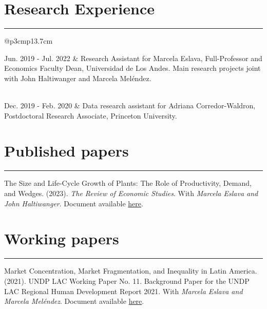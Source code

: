 \documentclass[12pt, letterpaper]{article}
\begin{document}
\section*{Research Experience}
\vspace*{-8mm}
\noindent \rule{\linewidth}{0.2mm}
\noindent
\begin{tabular}{@{}p{3cm}p{13.7cm}}
\raggedright{Jun. 2019 - Jul. 2022} &  Research Assistant for Marcela Eslava, Full-Professor and Economics Faculty Dean, Universidad de Los Andes. Main research projects joint with John Haltiwanger and Marcela Meléndez.  \\ 
\\ [-3mm]
\raggedright{Dec. 2019 - \newline Feb. 2020} & Data research assistant for Adriana Corredor-Waldron, Postdoctoral Research Associate, Princeton University.
\end{tabular}

\vspace*{-2mm}

\section*{Published papers}
\vspace*{-8mm}
\noindent \rule{\linewidth}{0.2mm}
\noindent The Size and Life-Cycle Growth of Plants: The Role of Productivity, Demand, and Wedges. (2023). \textit{The Review of Economic Studies}.   With \textit{Marcela Eslava and John Haltiwanger}. Document available \href{https://academic.oup.com/restud/advance-article/doi/10.1093/restud/rdad029/7054272?login=true}{here}. 

\vspace*{-5mm}

\section*{Working papers}
\vspace*{-8mm}
\noindent \rule{\linewidth}{0.2mm}

\noindent Market Concentration, Market Fragmentation, and Inequality in Latin America. (2021). UNDP LAC Working Paper No. 11. Background Paper for the UNDP LAC Regional Human Development Report 2021.  With \textit{Marcela Eslava and Marcela Meléndez}. Document available \href{https://www.latinamerica.undp.org/content/rblac/en/home/library/poverty/market-concentration--market-fragmentation--and-inequality-in-la.html}{here}. \\ [-3mm]
\end{document}
